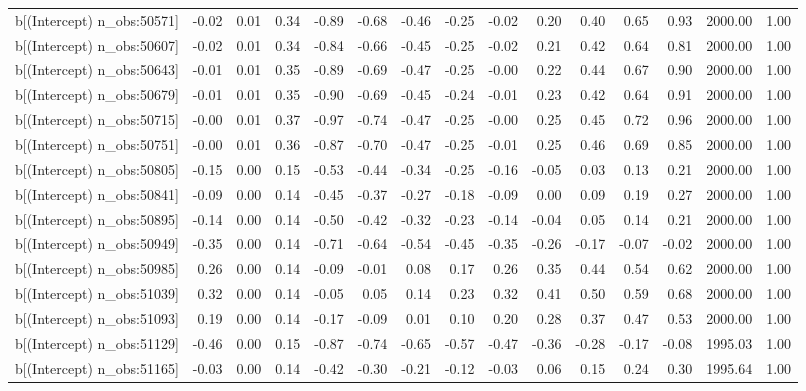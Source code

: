 \begin{table}[ht]
\begin{tabular}{rrrrrrrrrrrrrrr}
  b[(Intercept) n\_obs:50571] & -0.02 & 0.01 & 0.34 & -0.89 & -0.68 & -0.46 & -0.25 & -0.02 & 0.20 & 0.40 & 0.65 & 0.93 & 2000.00 & 1.00 \\ 
  b[(Intercept) n\_obs:50607] & -0.02 & 0.01 & 0.34 & -0.84 & -0.66 & -0.45 & -0.25 & -0.02 & 0.21 & 0.42 & 0.64 & 0.81 & 2000.00 & 1.00 \\ 
  b[(Intercept) n\_obs:50643] & -0.01 & 0.01 & 0.35 & -0.89 & -0.69 & -0.47 & -0.25 & -0.00 & 0.22 & 0.44 & 0.67 & 0.90 & 2000.00 & 1.00 \\ 
  b[(Intercept) n\_obs:50679] & -0.01 & 0.01 & 0.35 & -0.90 & -0.69 & -0.45 & -0.24 & -0.01 & 0.23 & 0.42 & 0.64 & 0.91 & 2000.00 & 1.00 \\ 
  b[(Intercept) n\_obs:50715] & -0.00 & 0.01 & 0.37 & -0.97 & -0.74 & -0.47 & -0.25 & -0.00 & 0.25 & 0.45 & 0.72 & 0.96 & 2000.00 & 1.00 \\ 
  b[(Intercept) n\_obs:50751] & -0.00 & 0.01 & 0.36 & -0.87 & -0.70 & -0.47 & -0.25 & -0.01 & 0.25 & 0.46 & 0.69 & 0.85 & 2000.00 & 1.00 \\ 
  b[(Intercept) n\_obs:50805] & -0.15 & 0.00 & 0.15 & -0.53 & -0.44 & -0.34 & -0.25 & -0.16 & -0.05 & 0.03 & 0.13 & 0.21 & 2000.00 & 1.00 \\ 
  b[(Intercept) n\_obs:50841] & -0.09 & 0.00 & 0.14 & -0.45 & -0.37 & -0.27 & -0.18 & -0.09 & 0.00 & 0.09 & 0.19 & 0.27 & 2000.00 & 1.00 \\ 
  b[(Intercept) n\_obs:50895] & -0.14 & 0.00 & 0.14 & -0.50 & -0.42 & -0.32 & -0.23 & -0.14 & -0.04 & 0.05 & 0.14 & 0.21 & 2000.00 & 1.00 \\ 
  b[(Intercept) n\_obs:50949] & -0.35 & 0.00 & 0.14 & -0.71 & -0.64 & -0.54 & -0.45 & -0.35 & -0.26 & -0.17 & -0.07 & -0.02 & 2000.00 & 1.00 \\ 
  b[(Intercept) n\_obs:50985] & 0.26 & 0.00 & 0.14 & -0.09 & -0.01 & 0.08 & 0.17 & 0.26 & 0.35 & 0.44 & 0.54 & 0.62 & 2000.00 & 1.00 \\ 
  b[(Intercept) n\_obs:51039] & 0.32 & 0.00 & 0.14 & -0.05 & 0.05 & 0.14 & 0.23 & 0.32 & 0.41 & 0.50 & 0.59 & 0.68 & 2000.00 & 1.00 \\ 
  b[(Intercept) n\_obs:51093] & 0.19 & 0.00 & 0.14 & -0.17 & -0.09 & 0.01 & 0.10 & 0.20 & 0.28 & 0.37 & 0.47 & 0.53 & 2000.00 & 1.00 \\ 
  b[(Intercept) n\_obs:51129] & -0.46 & 0.00 & 0.15 & -0.87 & -0.74 & -0.65 & -0.57 & -0.47 & -0.36 & -0.28 & -0.17 & -0.08 & 1995.03 & 1.00 \\ 
  b[(Intercept) n\_obs:51165] & -0.03 & 0.00 & 0.14 & -0.42 & -0.30 & -0.21 & -0.12 & -0.03 & 0.06 & 0.15 & 0.24 & 0.30 & 1995.64 & 1.00 \\ 

\end{tabular}
\end{table}
